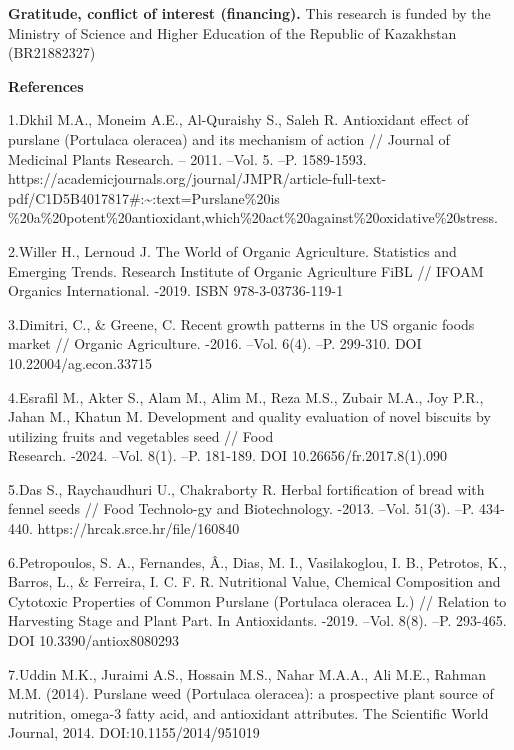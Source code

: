 {\bfseries Gratitude, conflict of interest (financing).} This research is
funded by the Ministry of Science and Higher Education of the Republic
of Kazakhstan (BR21882327)



\begin{center}
  {\bfseries References}
  \end{center}


\begin{noparindent}

1.Dkhil M.A., Moneim A.E., Al-Quraishy S., Saleh R. Antioxidant effect
of purslane (Portulaca oleracea) and its mechanism of action // Journal
of Medicinal Plants Research. -- 2011. --Vol. 5. --P. 1589-1593.
https://academicjournals.org/journal/JMPR/article-full-text-pdf/C1D5B4017817\#:\textasciitilde:text=Purslane\%20is\\\%20a\%20potent\%20antioxidant,which\%20act\%20against\%20oxidative\%20stress.

2.Willer H., Lernoud J. The World of Organic Agriculture. Statistics and
Emerging Trends. Research Institute of Organic Agriculture FiBL // IFOAM
Organics International. -2019. ISBN 978-3-03736-119-1

3.Dimitri, C., \& Greene, C. Recent growth patterns in the US organic
foods market // Organic Agriculture. -2016. --Vol. 6(4). --P. 299-310.
DOI 10.22004/ag.econ.33715

4.Esrafil M., Akter S., Alam M., Alim M., Reza M.S., Zubair M.A., Joy
P.R., Jahan M., Khatun M. Development and quality evaluation of novel
biscuits by utilizing fruits and vegetables seed // Food \\Research.
-2024. --Vol. 8(1). --P. 181-189. DOI 10.26656/fr.2017.8(1).090

5.Das S., Raychaudhuri U., Chakraborty R. Herbal fortification of bread
with fennel seeds // Food Technolo-gy and Biotechnology. -2013. --Vol.
51(3). --P. 434-440. https://hrcak.srce.hr/file/160840

6.Petropoulos, S. A., Fernandes, Â., Dias, M. I., Vasilakoglou, I. B.,
Petrotos, K., Barros, L., \& Ferreira, I. C. F. R. Nutritional Value,
Chemical Composition and Cytotoxic Properties of Common Purslane
(Portulaca oleracea L.) // Relation to Harvesting Stage and Plant Part.
In Antioxidants. -2019. --Vol. 8(8). --P. 293-465. DOI
10.3390/antiox8080293

7.Uddin M.K., Juraimi A.S., Hossain M.S., Nahar M.A.A., Ali M.E., Rahman
M.M. (2014). Purslane weed (Portulaca oleracea): a prospective plant
source of nutrition, omega-3 fatty acid, and antioxidant attributes. The
Scientific World Journal, 2014. DOI:10.1155/2014/951019


\end{noparindent}
